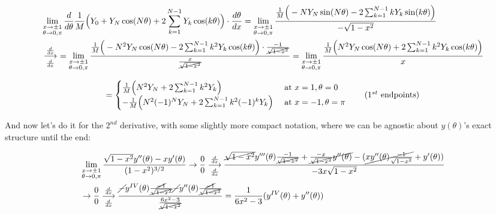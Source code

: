 \documentclass[10pt]{article}
\begin{document}
\begin{align*}
&\lim_{\substack{x \to \pm 1 \\ \theta \to 0,\pi}} \frac{d}{d\theta} \frac{1}{M} \Big( Y_0 + Y_N \cos(N\theta) + 2 \sum_{k=1}^{N-1} Y_k \cos(k\theta) \Big) \cdot \frac{d\theta}{dx} = \lim_{\substack{x \to \pm 1 \\ \theta \to 0,\pi}} \frac{\frac{1}{M} \Big(-N Y_N \sin(N\theta) - 2 \sum_{k=1}^{N-1} k Y_k \sin(k\theta) \Big)}{-\sqrt{1-x^2}} \\
&\underset{\frac{d}{dx}}{\overset{\frac{d}{dx}}{\longrightarrow}}\ = \lim_{\substack{x \to \pm 1 \\ \theta \to 0,\pi}} \frac{\frac{1}{M} \Big(-N^2 Y_N \cos(N\theta) - 2 \sum_{k=1}^{N-1} k^2 Y_k \cos(k\theta) \Big) \cdot \frac{-1}{\cancel{\sqrt{1-x^2}}}}{\frac{x}{\cancel{\sqrt{1-x^2}}}} = \lim_{\substack{x \to \pm 1 \\ \theta \to 0,\pi}} \frac{\frac{1}{M} \Big(N^2 Y_N \cos(N\theta) + 2 \sum_{k=1}^{N-1} k^2 Y_k \cos(k\theta) \Big)}{x}
\end{align*}

\[
= \begin{cases} \frac{1}{M} \Big(N^2 Y_N + 2 \sum_{k=1}^{N-1} k^2 Y_k \Big) & \text{ at } x=1, \theta=0 \\ -\frac{1}{M} \Big(N^2 (-1)^N Y_N + 2 \sum_{k=1}^{N-1} k^2 (-1)^k Y_k \Big) & \text{ at } x=-1, \theta=\pi \end{cases} \tag{$1^{st}$ endpoints}
\]

And now let's do it for the $2^{nd}$ derivative, with some slightly more compact notation, where we can be agnostic about $y(\theta)$'s exact structure until the end:

\begin{align*}
&\lim_{\substack{x \to \pm 1 \\ \theta \to 0,\pi}} \frac{\sqrt{1 - x^2} y''(\theta) - x y'(\theta)}{(1-x^2)^{3/2}} \rightarrow \frac{0}{0} \underset{\frac{d}{dx}}{\overset{\frac{d}{dx}}{\longrightarrow}} \frac{\cancel{\sqrt{1-x^2}}y'''(\theta)\frac{-1}{\cancel{\sqrt{1-x^2}}} + \cancel{\frac{-x}{\sqrt{1-x^2}}y''(\theta)} - (\cancel{xy''(\theta)\frac{-1}{\sqrt{1-x^2}}} + y'(\theta))}{-3x\sqrt{1-x^2}}\\
& \rightarrow \frac{0}{0} \underset{\frac{d}{dx}}{\overset{\frac{d}{dx}}{\longrightarrow}} \frac{\cancel{-}y^{IV}(\theta)\frac{\cancel{-1}}{\cancel{\sqrt{1-x^2}}} \cancel{-} y''(\theta)\frac{\cancel{-1}}{\cancel{\sqrt{1-x^2}}}}{\frac{6x^2 - 3}{\cancel{\sqrt{1-x^2}}}} = \frac{1}{6x^2 - 3}(y^{IV}(\theta) + y''(\theta))
\end{align*}
\end{document}
